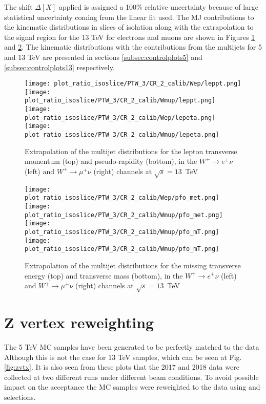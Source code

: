 The shift $\Delta[X]$ applied is assigned a 100\% relative uncertainty because of large statistical uncertainty coming from the linear fit used.
The MJ contributions to the kinematic distributions in slices of isolation along with the extrapolation to the signal region for the 13 TeV for electrons and muons are shown in Figures \ref{fig:mjbkg-shape-lep} and \ref{fig:mjbkg-shape}. The kinematic distributions with the contributions from the multijets for 5 and 13 TeV are presented in sections \ref{subsec:controlplots5} and \ref{subsec:controlplots13} respectively.
\begin{figure}[htbp]
	\centering
	\texttt{[image: plot\_ratio\_isoslice/PTW\_3/CR\_2\_calib/Wep/leppt.png]}
	\texttt{[image: plot\_ratio\_isoslice/PTW\_3/CR\_2\_calib/Wmup/leppt.png]}\\
	\texttt{[image: plot\_ratio\_isoslice/PTW\_3/CR\_2\_calib/Wep/lepeta.png]}
	\texttt{[image: plot\_ratio\_isoslice/PTW\_3/CR\_2\_calib/Wmup/lepeta.png]}\\
	\caption{Extrapolation of the multijet distributions for the lepton transverse momentum (top) and pseudo-rapidity (bottom), in the $W^+\to e^+\nu$ (left) and $W^+\to \mu^+\nu$ (right) channels at $\sqrt{s}=13$~TeV}
	\label{fig:mjbkg-shape-lep}
\end{figure}

\begin{figure}[htbp]
	\texttt{[image: plot\_ratio\_isoslice/PTW\_3/CR\_2\_calib/Wep/pfo\_met.png]}
	\texttt{[image: plot\_ratio\_isoslice/PTW\_3/CR\_2\_calib/Wmup/pfo\_met.png]}\\
	\texttt{[image: plot\_ratio\_isoslice/PTW\_3/CR\_2\_calib/Wmup/pfo\_mT.png]}
	\texttt{[image: plot\_ratio\_isoslice/PTW\_3/CR\_2\_calib/Wmup/pfo\_mT.png]}\\
	\caption{Extrapolation of the multijet distributions for the missing transverse energy (top) and transverse mass (bottom), in the $W^+\to e^+\nu$ (left) and $W^+\to \mu^+\nu$ (right) channels at $\sqrt{s}=13$~TeV}
	\label{fig:mjbkg-shape}
\end{figure}
\clearpage
     \section{Z vertex reweighting }
The 5 TeV MC samples have been generated to be perfectly matched to the data 
Although this is not the case for 13 TeV samples, which can be seen at Fig. \ref{fig:zvtx}. 
It is also seen from these plots that the 2017 and 2018 data were collected at two different runs under different beam conditions. 
To avoid possible impact on the acceptance the MC samples were reweighted to the data using \Zee and \Zmm selections.

